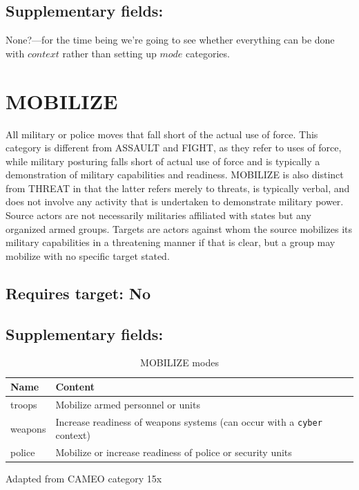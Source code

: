 \documentclass[11pt]{report}
\newcommand{\plcat}[1]{\textsf{#1}}
\newcommand{\txt}[1]{\texttt{#1}}
\begin{document}
\subsection{Supplementary fields:}

None?---for the time being we're going to see whether everything can be done with $context$ rather than setting up $mode$ categories.

\newpage  

\section{MOBILIZE}

All military or police moves that fall short of the actual use of force. This category is different from \plcat{ASSAULT} and \plcat{FIGHT}, as they refer to uses of force, while military posturing falls short of actual use of force and is typically a demonstration of military capabilities and readiness. \plcat{MOBILIZE} is also distinct from \plcat{THREAT} in that the latter refers merely to threats, is typically verbal, and does not involve any activity that is undertaken to demonstrate military power. Source actors  are not necessarily militaries affiliated with states but any organized armed groups. Targets are actors against whom the source mobilizes its military capabilities in a threatening manner if that is clear, but a group may mobilize with no specific target stated.



\subsection{Requires target: No}

\subsection{Supplementary fields: }

\begin{table}[htp]
\caption{MOBILIZE modes}
\begin{center}
\begin{tabular}{|l|p{13cm}|}
\hline
Name & Content \\
\hline
troops & Mobilize armed personnel or units\\
weapons & Increase readiness of weapons systems (can occur with a \txt{cyber} context) \\
police & Mobilize or increase readiness of police or security units\\
\hline
\end{tabular}
\end{center}
\label{tab:mobilizemode}
Adapted from CAMEO category 15x
\end{table}
\end{document}
